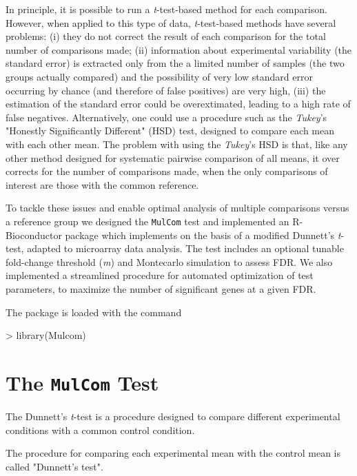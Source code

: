 \documentclass[a4paper]{article}
\begin{document}
In principle, it is possible to run a \emph{t}-test-based method for each comparison. 
However, when applied to this type of data, \emph{t}-test-based methods 
have several problems: (i) they do not correct the result of each comparison for the 
total number of comparisons made; (ii) information about experimental variability 
(the standard error) is extracted only from the a limited number of samples (the two groups actually compared) and 
the possibility of very low standard error occurring by chance (and therefore of 
false positives) are very high, (iii) the estimation of the standard error 
could be overextimated, leading to a high rate of false negatives. Alternatively, one could use a procedure 
such as the \emph{Tukey}'s "Honestly Significantly Different" (HSD) test, 
designed to compare each mean with each other mean. The problem with using the 
\emph{Tukey}'s HSD is that, like any other method designed for systematic pairwise comparison of all means,
 it over corrects for the number of comparisons made, when 
the only comparisons of interest are those with the common reference. 

To tackle these issues and enable optimal analysis of multiple comparisons versus 
a reference group we designed the \texttt{MulCom} test and implemented an R-Bioconductor \cite{Gentleman} package 
which implements on the basis of a modified Dunnett's \emph{t}-test, adapted to microarray data analysis. 
The test includes an optional tunable fold-change threshold 
(\emph{m}) and Montecarlo simulation to assess FDR. 
We also implemented a streamlined procedure for automated optimization of test 
parameters, to maximize the number of significant genes at a given FDR.

The package is loaded with the command

\begin{Schunk}
\begin{Sinput}
> library(Mulcom)
\end{Sinput}
\end{Schunk}

\newpage
\section{The \texttt{MulCom} Test}

The Dunnett's \emph{t}-test is a procedure designed to compare 
different experimental conditions with a common control condition.

The procedure for comparing each experimental mean with the control mean is called 
"Dunnett's test". 
\end{document}

